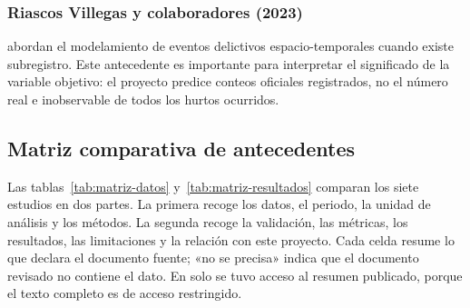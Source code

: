\subsubsection{Riascos Villegas y colaboradores (2023)}

\citet{riascos2023} abordan el modelamiento de eventos delictivos espacio-temporales cuando existe subregistro. Este antecedente es importante para interpretar el significado de la variable objetivo: el proyecto predice conteos oficiales registrados, no el número real e inobservable de todos los hurtos ocurridos.

\subsection{Matriz comparativa de antecedentes}

Las tablas~\ref{tab:matriz-datos} y~\ref{tab:matriz-resultados} comparan los siete estudios en dos partes. La primera recoge los datos, el periodo, la unidad de análisis y los métodos. La segunda recoge la validación, las métricas, los resultados, las limitaciones y la relación con este proyecto. Cada celda resume lo que declara el documento fuente; «no se precisa» indica que el documento revisado no contiene el dato. En \citet{urcuqui2020} solo se tuvo acceso al resumen publicado, porque el texto completo es de acceso restringido.

